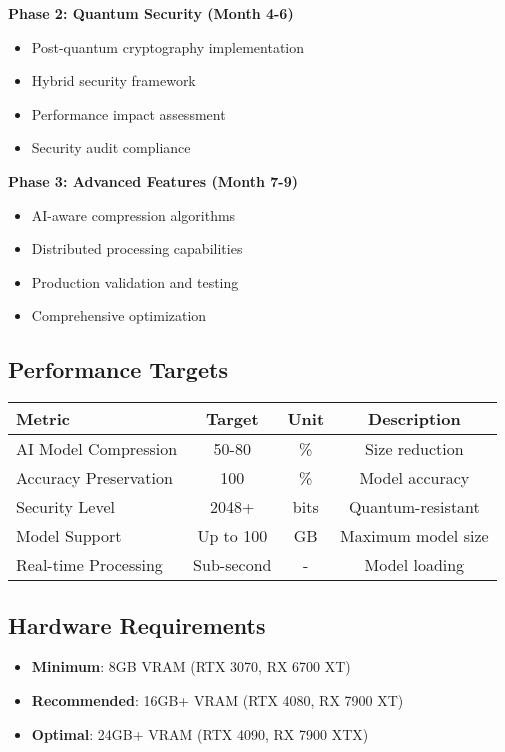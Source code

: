 \documentclass[12pt,a4paper]{article}
\begin{document}
\textbf{Phase 2: Quantum Security (Month 4-6)}
\begin{itemize}
    \item Post-quantum cryptography implementation
    \item Hybrid security framework
    \item Performance impact assessment
    \item Security audit compliance
\end{itemize}

\textbf{Phase 3: Advanced Features (Month 7-9)}
\begin{itemize}
    \item AI-aware compression algorithms
    \item Distributed processing capabilities
    \item Production validation and testing
    \item Comprehensive optimization
\end{itemize}

\subsection{Performance Targets}
\begin{center}
\begin{tabular}{|l|c|c|c|}
\hline
\textbf{Metric} & \textbf{Target} & \textbf{Unit} & \textbf{Description} \\
\hline
AI Model Compression & 50-80 & \% & Size reduction \\
Accuracy Preservation & 100 & \% & Model accuracy \\
Security Level & 2048+ & bits & Quantum-resistant \\
Model Support & Up to 100 & GB & Maximum model size \\
Real-time Processing & Sub-second & - & Model loading \\
\hline
\end{tabular}
\end{center}

\subsection{Hardware Requirements}
\begin{itemize}
    \item \textbf{Minimum}: 8GB VRAM (RTX 3070, RX 6700 XT)
    \item \textbf{Recommended}: 16GB+ VRAM (RTX 4080, RX 7900 XT)
    \item \textbf{Optimal}: 24GB+ VRAM (RTX 4090, RX 7900 XTX)
\end{itemize}
\end{document}
